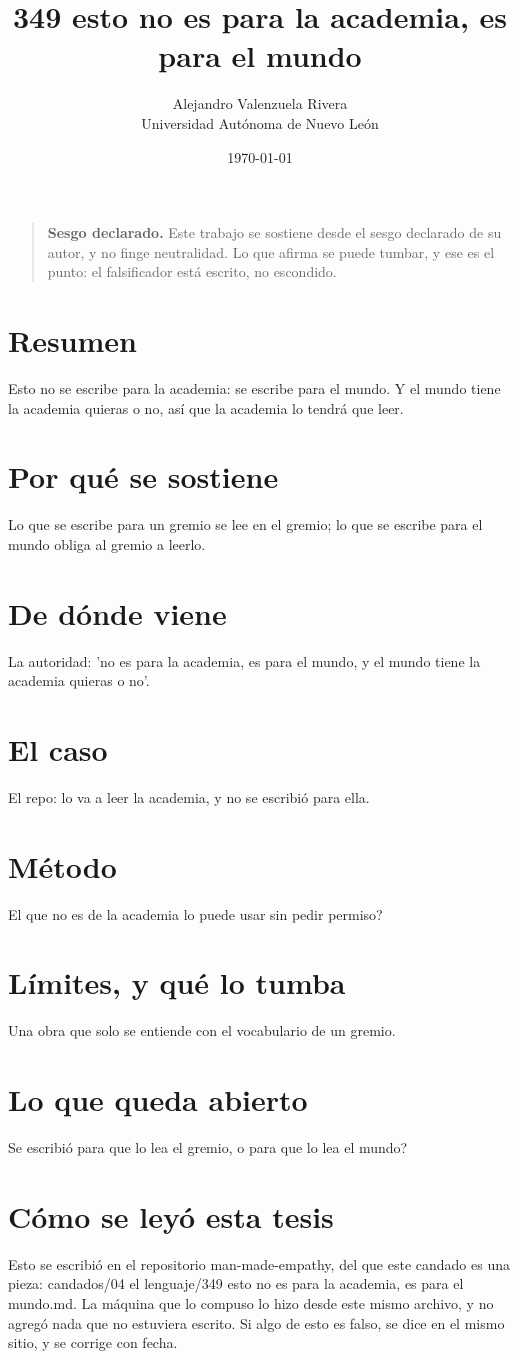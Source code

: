 \documentclass[11pt,a4paper]{article}
\title{349 esto no es para la academia, es para el mundo}
\author{Alejandro Valenzuela Rivera\\\small Universidad Autónoma de Nuevo León}
\date{\today}
\begin{document}
\maketitle

\begin{quote}
\textbf{Sesgo declarado.} Este trabajo se sostiene desde el sesgo declarado de su autor, y no finge neutralidad. Lo que afirma se puede tumbar, y ese es el punto: el falsificador está escrito, no escondido.
\end{quote}

\section*{Resumen}
Esto no se escribe para la academia: se escribe para el mundo. Y el mundo tiene la academia quieras o no, así que la academia lo tendrá que leer.

\section{Por qué se sostiene}
Lo que se escribe para un gremio se lee en el gremio; lo que se escribe para el mundo obliga al gremio a leerlo.

\section{De dónde viene}
La autoridad: 'no es para la academia, es para el mundo, y el mundo tiene la academia quieras o no'.

\section{El caso}
El repo: lo va a leer la academia, y no se escribió para ella.

\section{Método}
\textquestiondown{}El que no es de la academia lo puede usar sin pedir permiso?

\section{Límites, y qué lo tumba}
Una obra que solo se entiende con el vocabulario de un gremio.

\section{Lo que queda abierto}
\textquestiondown{}Se escribió para que lo lea el gremio, o para que lo lea el mundo?

\section*{Cómo se leyó esta tesis}
Esto se escribió en el repositorio man-made-empathy, del que este candado es una pieza: candados/04 el lenguaje/349 esto no es para la academia, es para el mundo.md. La máquina que lo compuso lo hizo desde este mismo archivo, y no agregó nada que no estuviera escrito. Si algo de esto es falso, se dice en el mismo sitio, y se corrige con fecha.
\end{document}

